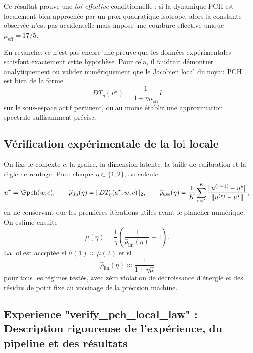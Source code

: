 \begin{remark}
Ce résultat prouve une \emph{loi effective} conditionnelle : si la dynamique PCH est localement bien approchée par un prox quadratique isotrope, alors la constante observée n'est pas accidentelle mais impose une courbure effective unique $\mu_{\mathrm{eff}}=17/5$.

En revanche, ce n'est pas encore une preuve que les données expérimentales satisfont exactement cette hypothèse. Pour cela, il faudrait démontrer analytiquement ou valider numériquement que le Jacobien local du noyau PCH est bien de la forme
\[
D T_\eta(u^\star)=\frac{1}{1+\eta\mu_{\mathrm{eff}}}I
\]
sur le sous-espace actif pertinent, ou au moins établir une approximation spectrale suffisamment précise.
\end{remark}





\subsection{Vérification expérimentale de la loi locale}
On fixe le contexte \(c\), la graine, la dimension latente, la taille de calibration et la règle de routage.
Pour chaque \(\eta\in\{1,2\}\), on calcule :
\[
u^\star=\Ppch(w;c),\qquad
\widehat\rho_{\mathrm{lin}}(\eta)=\|DT_\eta(u^\star;w,c)\|_2,
\qquad
\widehat\rho_{\mathrm{use}}(\eta)=\frac{1}{K}\sum_{r=1}^K
\frac{\|u^{(r+1)}-u^\star\|}{\|u^{(r)}-u^\star\|},
\]
en ne conservant que les premières itérations utiles avant le plancher numérique.
On estime ensuite
\[
\widehat\mu(\eta)=\frac{1}{\eta}\left(\frac{1}{\widehat\rho_{\mathrm{lin}}(\eta)}-1\right).
\]
La loi est acceptée si \(\widehat\mu(1)\approx \widehat\mu(2)\) et si
\[
\widehat\rho_{\mathrm{lin}}(\eta)\approx \frac{1}{1+\eta\widehat\mu}
\]
pour tous les régimes testés, avec zéro violation de décroissance d’énergie et des résidus de point fixe au voisinage de la précision machine.







\subsection{Experience "verify_pch_local_law" : Description rigoureuse de l'expérience, du pipeline et des résultats}

